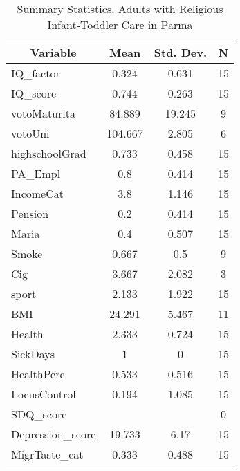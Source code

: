 
\begin{table}[htbp]\centering \caption{Summary Statistics. Adults with Religious Infant-Toddler Care in Parma \label{bothAdultasiloReliParma}}
\begin{tabular}{l c c  c}\hline\hline
\multicolumn{1}{c}{\textbf{Variable}} & \textbf{Mean}
 & \textbf{Std. Dev.} & \textbf{N}\\ \hline
IQ\_factor & 0.324 & 0.631  & 15\\
IQ\_score & 0.744 & 0.263  & 15\\
votoMaturita & 84.889 & 19.245  & 9\\
votoUni & 104.667 & 2.805  & 6\\
highschoolGrad & 0.733 & 0.458  & 15\\
PA\_Empl & 0.8 & 0.414  & 15\\
IncomeCat & 3.8 & 1.146  & 15\\
Pension & 0.2 & 0.414  & 15\\
Maria & 0.4 & 0.507  & 15\\
Smoke & 0.667 & 0.5  & 9\\
Cig & 3.667 & 2.082  & 3\\
sport & 2.133 & 1.922  & 15\\
BMI & 24.291 & 5.467  & 11\\
Health & 2.333 & 0.724  & 15\\
SickDays & 1 & 0  & 15\\
HealthPerc & 0.533 & 0.516  & 15\\
LocusControl & 0.194 & 1.085  & 15\\
SDQ\_score &  &   & 0\\
Depression\_score & 19.733 & 6.17  & 15\\
MigrTaste\_cat & 0.333 & 0.488  & 15\\
\hline\end{tabular}
\end{table}
